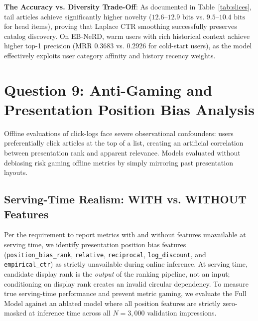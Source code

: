 \documentclass[11pt,a4paper]{article}
\begin{document}
\noindent\textbf{The Accuracy vs. Diversity Trade-Off}: As documented in Table~\ref{tab:slices}, tail articles achieve significantly higher novelty ($12.6$--$12.9\text{ bits}$ vs. $9.5$--$10.4\text{ bits}$ for head items), proving that Laplace CTR smoothing successfully preserves catalog discovery. On EB-NeRD, warm users with rich historical context achieve higher top-1 precision (MRR $0.3683$ vs. $0.2926$ for cold-start users), as the model effectively exploits user category affinity and history recency weights.

\section{Question 9: Anti-Gaming and Presentation Position Bias Analysis}

Offline evaluations of click-logs face severe observational confounders: users preferentially click articles at the top of a list, creating an artificial correlation between presentation rank and apparent relevance. Models evaluated without debiasing risk gaming offline metrics by simply mirroring past presentation layouts.

\subsection{Serving-Time Realism: WITH vs. WITHOUT Features}
Per the requirement to report metrics with and without features unavailable at serving time, we identify presentation position bias features (\texttt{position\_bias\_rank}, \texttt{relative}, \texttt{reciprocal}, \texttt{log\_discount}, and \texttt{empirical\_ctr}) as strictly unavailable during online inference. At serving time, candidate display rank is the \textit{output} of the ranking pipeline, not an input; conditioning on display rank creates an invalid circular dependency. To measure true serving-time performance and prevent metric gaming, we evaluate the Full Model against an ablated model where all position features are strictly zero-masked at inference time across all $N=3,000$ validation impressions.
\end{document}
